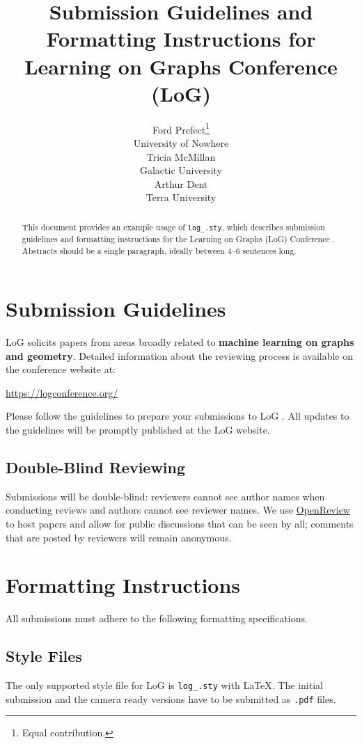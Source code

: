 \documentclass{article}
\title[Submission Guidelines and Formatting Instructions for LoG Conference \logyear]{Submission Guidelines and Formatting Instructions for Learning on Graphs Conference (LoG) \logyear}
\author[Prefect et al.]{%
Ford Prefect\thanks{Equal contribution.}\\
University of Nowhere \\
\email{prefect@nowehere.com}\And
Tricia McMillan\footnotemark[1]\\
Galactic University\\
\email{trillian@galactic.edu}\And
Arthur Dent\\
Terra University\\
\email{dent@terra.edu}
}
\begin{document}
\maketitle

\begin{abstract}
This document provides an example usage of \verb+log_+\logyear\verb+.sty+, which describes submission guidelines and formatting instructions for the Learning on Graphs (LoG) Conference \logyear{}.
Abstracts should be a single paragraph, ideally between 4--6 sentences long.
\end{abstract}

\section{Submission Guidelines}

LoG \logyear{} solicits papers from areas broadly related to \textbf{machine learning on graphs and geometry}.
Detailed information about the reviewing process is available on the conference website at:
\begin{center}
	\url{https://logconference.org/}
\end{center}
Please follow the guidelines to prepare your submissions to LoG \logyear{}. All updates to the guidelines will be promptly published at the LoG website.

\subsection{Double-Blind Reviewing}
Submissions will be double-blind: reviewers cannot see author names when conducting reviews and authors cannot see reviewer names.
We use \href{https://openreview.net/group?id=logconference.io/LOG/\logyear/Conference}{OpenReview} to host papers and allow for public discussions that can be seen by all; comments that are posted by reviewers will remain anonymous.

\section{Formatting Instructions}

All submissions must adhere to the following formatting specifications.

\subsection{Style Files}

The only supported style file for LoG \logyear{} is \verb+log_+\logyear\verb+.sty+ with \LaTeX.
The initial submission and the camera ready versions have to be submitted as \texttt{.pdf} files.
\end{document}
